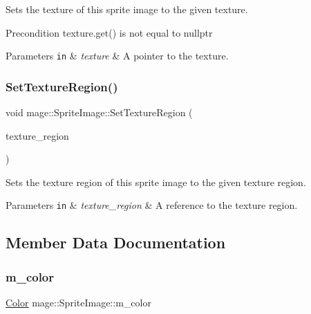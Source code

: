 Sets the texture of this sprite image to the given texture.

\begin{DoxyPrecond}{Precondition}
{\ttfamily texture.\+get()} is not equal to {\ttfamily nullptr} 
\end{DoxyPrecond}

\begin{DoxyParams}[1]{Parameters}
\mbox{\tt in}  & {\em texture} & A pointer to the texture. \\
\hline
\end{DoxyParams}
\hypertarget{classmage_1_1_sprite_image_a99640fe6fc85d704f6a2831d0f663033}{}\label{classmage_1_1_sprite_image_a99640fe6fc85d704f6a2831d0f663033} 
\subsubsection{\texorpdfstring{Set\+Texture\+Region()}{SetTextureRegion()}}
{\footnotesize\ttfamily void mage\+::\+Sprite\+Image\+::\+Set\+Texture\+Region (\begin{DoxyParamCaption}\item[{const R\+E\+CT \&}]{texture\+\_\+region }\end{DoxyParamCaption})}

Sets the texture region of this sprite image to the given texture region.


\begin{DoxyParams}[1]{Parameters}
\mbox{\tt in}  & {\em texture\+\_\+region} & A reference to the texture region. \\
\hline
\end{DoxyParams}


\subsection{Member Data Documentation}
\hypertarget{classmage_1_1_sprite_image_a63331a3170f5af1a14b15913afc59ce2}{}\label{classmage_1_1_sprite_image_a63331a3170f5af1a14b15913afc59ce2} 
\subsubsection{\texorpdfstring{m\+\_\+color}{m\_color}}
{\footnotesize\ttfamily \hyperlink{structmage_1_1_color}{Color} mage\+::\+Sprite\+Image\+::m\+\_\+color\hspace{0.3cm}{\ttfamily [private]}}

